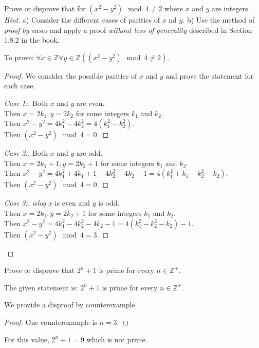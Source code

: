 \documentclass[a4paper]{exam}
\theoremstyle{definition}
\newcommand\Z{\ensuremath{\mathbb{Z}}}
\begin{document}
\begin{questions}
\question Prove or disprove that for $(x^2 - y^2) \mod 4 \neq 2$ where $x$ and $y$ are integers.\\
  \textit{Hint}: a) Consider the different cases of parities of $x$ nd $y$. b) Use the method of \textit{proof by cases} and apply a proof \textit{without loss of generality} described in Section 1.8.2 in the book.

  \begin{solution}
    To prove: $\forall x\in\Z\forall y\in\Z((x^2 - y^2) \mod 4 \neq 2)$.
    
    

    \begin{proof} We consider the possible parities of $x$ and $y$ and prove the statement for each case.
    \begin{proof}[Case 1:] Both $x$ and $y$ are even.\\
      Then $x=2k_1, y=2k_2$ for some integers $k_1$ and $k_2$.\\
      Then $x^2-y^2=4k_1^2-4k_2^2=4(k_1^2-k_2^2)$.\\
      Then $(x^2 - y^2) \mod 4 = 0$.
    \end{proof}
    
    \begin{proof}[Case 2:] Both $x$ and $y$ are odd.\\
      Then $x=2k_1+1, y=2k_2+1$ for some integers $k_1$ and $k_2$.\\
      Then $x^2-y^2=4k_1^2+4k_1+1-4k_2^2-4k_2-1=4(k_1^2+k_1-k_2^2-k_2)$.\\
      Then $(x^2 - y^2) \mod 4 = 0$.
    \end{proof}      
    \begin{proof}[Case 3:] \textit{wlog} $x$ is even and $y$ is odd.\\
      Then $x=2k_1, y=2k_2+1$ for some integers $k_1$ and $k_2$.\\
      Then $x^2-y^2=4k_1^2-4k_2^2-4k_2-1=4(k_1^2-k_2^2-k_2)-1$.\\
      Then $(x^2 - y^2) \mod 4 = 3$.
    \end{proof}
    
    \end{proof}
  \end{solution}

\question 
  Prove or disprove that $2^n + 1$ is prime for every $n\in\Z^+$.

  \begin{solution}
    The given statement is: $2^n + 1$ is prime for every $n\in\Z^+$.

    We provide a disproof by counterexample.

    \begin{proof}
      One counterexample is $n=3$.
    \end{proof}
        
    For this value, $2^n+1=9$ which is not prime.
  \end{solution}
\end{questions}
\end{document}
